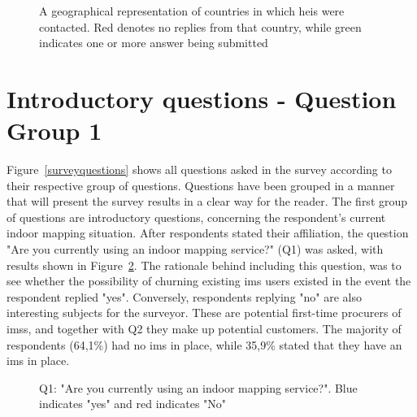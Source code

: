 \begin{figure}
    \centering
    \caption{A geographical representation of countries in which \glspl{hei} were contacted. Red denotes no replies from that country, while green indicates one or more answer being submitted}
    \label{fig:worldmap}
\end{figure}

\section{Introductory questions - Question Group 1}
Figure~\ref{surveyquestions} shows all questions asked in the survey according to their respective group of questions. Questions have been grouped in a manner that will present the survey results in a clear way for the reader. The first group of questions are introductory questions, concerning the respondent's current indoor mapping situation. After respondents stated their affiliation, the question "Are you currently using an indoor mapping service?" (Q1) was asked, with results shown in Figure~\ref{fig:q1}. The rationale behind including this question, was to see whether the possibility of churning existing \gls{ims} users existed in the event the respondent replied "yes". Conversely, respondents replying "no" are also interesting subjects for the surveyor. These are potential first-time procurers of \glspl{ims}, and together with Q2 they make up potential customers. The majority of respondents (64,1\%) had no \gls{ims} in place, while 35,9\% stated that they have an \gls{ims} in place. 

\begin{figure}[H]
    \centering
    \caption{Q1: "Are you currently using an indoor mapping service?". Blue indicates "yes" and red indicates "No"}
    \label{fig:q1}
\end{figure}


